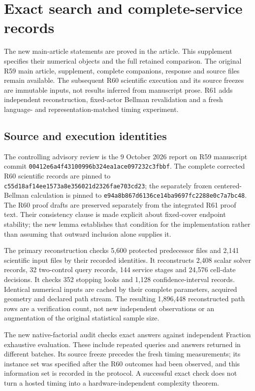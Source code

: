 \section{Exact search and complete-service records}\label{supp:records61}
The new main-article statements are proved in the article. This supplement specifies their numerical objects and the full retained comparison. The original R59 main article, supplement, complete companions, response and source files remain available. The subsequent R60 scientific execution and its source freezes are immutable inputs, not results inferred from manuscript prose. R61 adds independent reconstruction, fixed-actor Bellman revalidation and a fresh language- and representation-matched timing experiment.

\subsection{Source and execution identities}
The controlling advisory review is the 9 October 2026 report on R59 manuscript commit \nolinkurl{00412e6a4f43100996b324ea1ace097232c3fbbf}. The complete corrected R60 scientific records are pinned to \nolinkurl{c55d18af14ee1573a8e356021d2326fae703cd23}; the separately frozen centered-Bellman calculation is pinned to \nolinkurl{e94a8b867d6136ce14ba9697fc2288e0c7a7bc48}. The R60 proof drafts are preserved separately from the integrated R61 proof text. Their consistency clause is made explicit about fixed-cover endpoint stability; the new lemma establishes that condition for the implementation rather than assuming that outward inclusion alone supplies it.

The primary reconstruction checks 5,600 protected predecessor files and 2,141 scientific input files by their recorded identities. It reconstructs 2,408 scalar solver records, 32 two-control query records, 144 service stages and 24,576 cell-date decisions. It checks 352 stopping looks and 1,128 confidence-interval records. Identical numerical inputs are cached by their complete parameters, acquired geometry and declared path stream. The resulting 1,896,448 reconstructed path rows are a verification count, not new independent observations or an augmentation of the original statistical sample size.

The new native-factorial audit checks \NBOFactorialAnswers{} exact answers against independent Fraction exhaustive evaluation. These include repeated queries and answers returned in different batches. Its source freeze precedes the fresh timing measurements; its instance set was specified after the R60 outcomes had been observed, and this information set is recorded in the protocol. A successful exact check does not turn a hosted timing into a hardware-independent complexity theorem.


